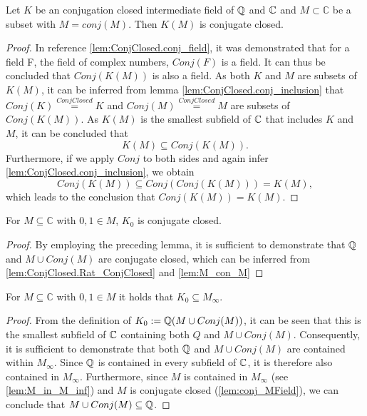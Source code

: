 \begin{lemma}
    \label{lem:conj_adjion}
    \leanok
    Let $K$ be an conjugation closed intermediate field of $\mathbb{Q}$ and $\mathbb{C}$ and $ M \subset \mathbb{C}$ be a subset with $M = conj(M)$. Then
    $K(M)$ is conjugate closed.
\end{lemma}
\begin{proof}
    \leanok
    In reference \ref{lem:ConjClosed.conj_field}, it was demonstrated that for a field F, the field of complex numbers, $Conj(F)$ is a field. 
    It can thus be concluded that $Conj(K(M))$ is also a field.
    As both $K$ and $M$ are subsets of $K(M)$, it can be inferred from lemma \ref{lem:ConjClosed.conj_inclusion} that $Conj(K) \overset{ConjClosed}{=} K$ and $Conj(M) \overset{ConjClosed}{=} M$ are subsets of $Conj(K(M))$. 
    As $K(M)$ is the smallest subfield of $\mathbb{C}$ that includes $K$ and $M$, it can be concluded that $$K(M) \subseteq Conj(K(M)).$$
    Furthermore, if we apply $Conj$ to both sides and again infer \ref{lem:ConjClosed.conj_inclusion}, we obtain $$Conj(K(M)) \subseteq Conj(Conj(K(M))) = K(M),$$ 
    which leads to the conclusion that $Conj(K(M)) = K(M)$.
\end{proof}

\begin{corollary}
    \label{cor:K_zero_conjectClosed}
    \leanok
    For $M\subseteq \mathbb{C}$ with $0,1 \in M$, $K_0$ is conjugate closed.
\end{corollary}
\begin{proof}
    \leanok
    By employing the preceding lemma, it is sufficient to demonstrate that $\mathbb{Q}$ and $M \cup Conj(M)$ are conjugate closed,
    which can be inferred from \ref{lem:ConjClosed.Rat_ConjClosed} and \ref{lem:M_con_M}
\end{proof}

\begin{lemma}
    \label{lem:K_zero_in_MField}
    \leanok
    For $M\subseteq \mathbb{C}$ with $0,1 \in M$ it holds that $K_0 \subseteq M_{\infty}$.
\end{lemma}
\begin{proof}
    \leanok
From the definition of $K_0 := \mathbb{Q}(M\cup Conj(M))$, 
it can be seen that this is the smallest subfield of $\mathbb{C}$ containing both $Q$ and $M\cup Conj(M)$. 
Consequently, it is sufficient to demonstrate that both $\mathbb{Q}$ and $M\cup Conj(M)$ are contained within $M_{\infty}$. 
Since $\mathbb{Q}$ is contained in every subfield of $\mathbb{C}$, it is therefore also contained in $M_{\infty}$. 
Furthermore, since $M$ is contained in $M_{\infty}$ (see \ref{lem:M_in_M_inf}) and $M$ is conjugate closed (\ref{lem:conj_MField}), we can conclude that $M\cup Conj(M) \subseteq \mathbb{Q}$.
\end{proof}

